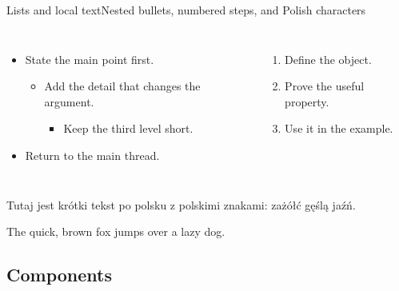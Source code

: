 \documentclass[aspectratio=169]{beamer}
\begin{document}
\begin{frame}[label=lists]{Lists and local text}{Nested bullets, numbered steps, and Polish characters}
  \begin{columns}[T,onlytextwidth]
      \begin{itemize}
        \item State the main point first.
        \begin{itemize}
          \item Add the detail that changes the argument.
          \begin{itemize}
            \item Keep the third level short.
          \end{itemize}
        \end{itemize}
        \item Return to the main thread.
      \end{itemize}

      \begin{enumerate}
        \item Define the object.
        \item Prove the useful property.
        \item Use it in the example.
      \end{enumerate}
  \end{columns}

  \vspace{.75em}
  \justifying\small
  {\foreignlanguage{polish}{Tutaj jest krótki tekst po polsku z polskimi znakami: zażółć gęślą jaźń.}}

  \vspace{.35em}
  The quick, brown fox jumps over a lazy dog.
\end{frame}

\subsection{Components}
\end{document}
